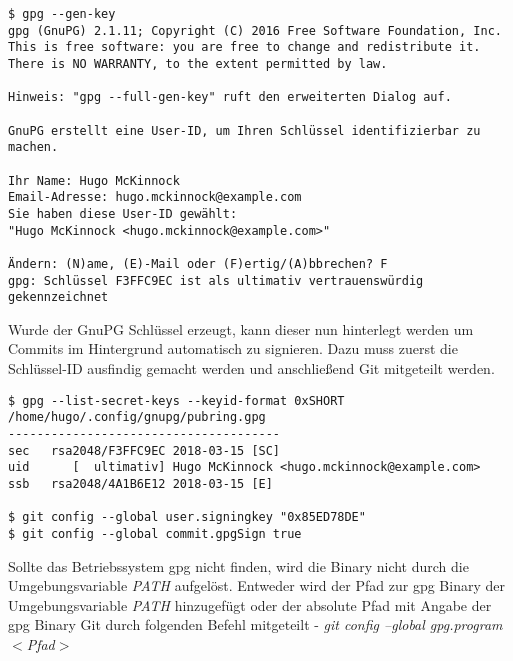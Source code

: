 \begin{verbatim}
$ gpg --gen-key
gpg (GnuPG) 2.1.11; Copyright (C) 2016 Free Software Foundation, Inc.
This is free software: you are free to change and redistribute it.
There is NO WARRANTY, to the extent permitted by law.

Hinweis: "gpg --full-gen-key" ruft den erweiterten Dialog auf.

GnuPG erstellt eine User-ID, um Ihren Schlüssel identifizierbar zu machen.

Ihr Name: Hugo McKinnock
Email-Adresse: hugo.mckinnock@example.com
Sie haben diese User-ID gewählt:
"Hugo McKinnock <hugo.mckinnock@example.com>"

Ändern: (N)ame, (E)-Mail oder (F)ertig/(A)bbrechen? F
gpg: Schlüssel F3FFC9EC ist als ultimativ vertrauenswürdig gekennzeichnet
\end{verbatim}

Wurde der GnuPG Schlüssel erzeugt, kann dieser nun hinterlegt werden um Commits im Hintergrund automatisch zu signieren. Dazu muss zuerst die Schlüssel-ID ausfindig gemacht werden und anschließend Git mitgeteilt werden.

\begin{verbatim}
$ gpg --list-secret-keys --keyid-format 0xSHORT
/home/hugo/.config/gnupg/pubring.gpg
--------------------------------------
sec   rsa2048/F3FFC9EC 2018-03-15 [SC]
uid      [  ultimativ] Hugo McKinnock <hugo.mckinnock@example.com>
ssb   rsa2048/4A1B6E12 2018-03-15 [E]

$ git config --global user.signingkey "0x85ED78DE"
$ git config --global commit.gpgSign true
\end{verbatim}

\begin{info-popup}
  Sollte das Betriebssystem gpg nicht finden, wird die Binary nicht durch die Umgebungsvariable \textit{PATH} aufgelöst. Entweder wird der Pfad zur gpg Binary der Umgebungsvariable \textit{PATH} hinzugefügt oder der absolute Pfad mit Angabe der gpg Binary Git durch folgenden Befehl mitgeteilt - \textit{git config --global gpg.program $ < $Pfad$ > $}
\end{info-popup}